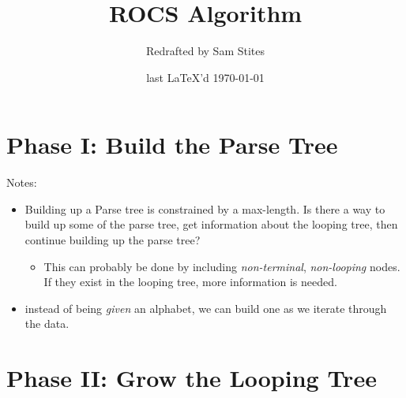 \documentclass{article}
\begin{document}
\title{ROCS Algorithm}
\author{Redrafted by Sam Stites}
\date{last \LaTeX 'd \today}
\maketitle

\section{Phase I: Build the Parse Tree}

Notes:

\begin{itemize}

\item Building up a Parse tree is constrained by a max-length. Is there a way to
build up some of the parse tree, get information about the looping tree, then
continue building up the parse tree?
  \begin{itemize}
    \item This can probably be done by including \textit{non-terminal},
      \textit{non-looping} nodes. If they exist in the looping tree, more
      information is needed.
  \end{itemize}

\item instead of being \textit{given} an alphabet, we can build one as we
  iterate through the data.

\end{itemize}

\section{Phase II: Grow the Looping Tree}
\end{document}

